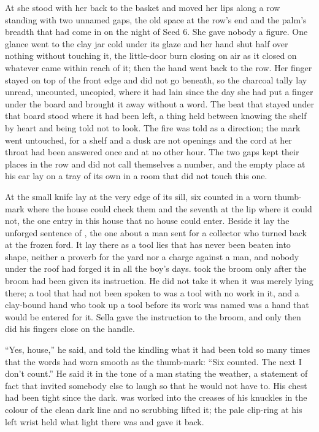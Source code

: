 \scenebreak

At  she stood with her back to the basket and moved her lips along a row standing with two unnamed gaps, the old space at the row's end and the palm's breadth that had come in on the night of Seed 6. She gave nobody a figure. One glance went to the clay jar cold under its glaze and her hand shut half over nothing without touching it, the little-door burn closing on air as it closed on whatever came within reach of it; then the hand went back to the row. Her finger stayed on top of the front edge and did not go beneath, so the charcoal tally lay unread, uncounted, uncopied, where it had lain since the day she had put a finger under the board and brought it away without a word. The beat that stayed under that board stood where it had been left, a thing held between knowing the shelf by heart and being told not to look. The fire was told  as a direction; the mark went untouched, for a shelf and a dusk are not openings and the cord at her throat had been answered once and at no other hour. The two gaps kept their places in the row and did not call themselves a number, and the empty place at his ear lay on a tray of its own in a room that did not touch this one.

\scenebreak

At  the small knife lay at the very edge of its sill, six counted in a worn thumb-mark where the house could check them and the seventh at the lip where it could not, the one entry in this house that no house could enter. Beside it lay the unforged sentence of , the one about a man sent for a collector who turned back at the frozen ford. It lay there as a tool lies that has never been beaten into shape, neither a proverb for the yard nor a charge against a man, and nobody under the roof had forged it in all the boy's days.  took the broom only after the broom had been given its instruction. He did not take it when it was merely lying there; a tool that had not been spoken to was a tool with no work in it, and a clay-bound hand who took up a tool before its work was named was a hand that would be entered for it. Sella gave the instruction to the broom, and only then did his fingers close on the handle.

“Yes, house,” he said, and told the kindling what it had been told so many times that the words had worn smooth as the thumb-mark: “Six counted. The next I don't count.” He said it in the tone of a man stating the weather, a statement of fact that invited somebody else to laugh so that he would not have to. His chest had been tight since the dark.  was worked into the creases of his knuckles in the colour of the clean dark line and no scrubbing lifted it; the pale clip-ring at his left wrist held what light there was and gave it back.

